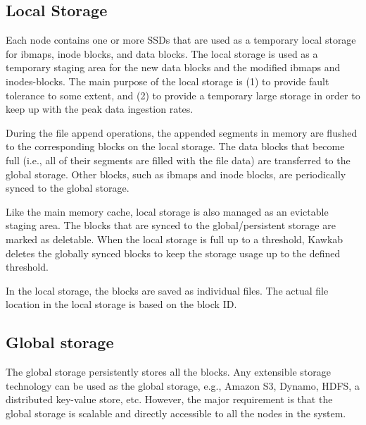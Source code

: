 \documentclass[]{article}
\begin{document}
\subsection{Local Storage} Each node contains one or more SSDs that are used as
a temporary local storage for ibmaps, inode blocks, and data blocks.  The local
storage is used as a temporary staging area for the new data blocks and the
modified ibmaps and inodes-blocks.  The main purpose of the local storage is
(1) to provide fault tolerance to some extent, and (2) to provide a temporary 
large storage in order to keep up with the peak data ingestion rates.

During the file append operations, the appended segments in memory are flushed
to the corresponding blocks on the local storage.  The data blocks that become
full (i.e., all of their segments are filled with the file data)
are transferred to the global storage.  Other blocks, such as ibmaps and
inode blocks, are periodically synced to the global storage.

Like the main memory cache, local storage is also managed as an evictable
staging area. The blocks that are synced to the global/persistent storage are
marked as deletable. When the local storage is full up to a threshold, Kawkab
deletes the globally synced blocks to keep the storage usage up to
the defined threshold.

In the local storage, the blocks are saved as individual files. The actual
file location in the local storage is based on the block ID.

%
%
%
%

\subsection{Global storage}

The global storage persistently stores all the blocks. Any extensible storage
technology can be used as the global storage, e.g., Amazon S3, Dynamo, HDFS, a
distributed key-value store, etc. However, the major requirement is that the 
global storage is scalable and directly accessible to all the nodes in the system.
\end{document}
